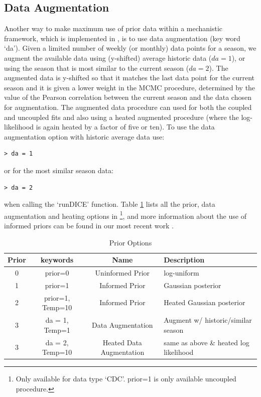 \documentclass[a4paper]{article}
\begin{document}
\subsection{Data Augmentation}
\label{sec:DA}
Another way to make maximum use of prior data within a mechanistic framework, which is implemented in , is to use data augmentation (key word `da'). Given a limited number of weekly (or monthly) data points for a season, we augment the available data using (y-shifted) average historic data ($da = 1$), or using the season that is most similar to the current season ($da = 2$).
The augmented data is y-shifted so that it matches the last data point for the current season and it is given a lower weight in the MCMC procedure, determined by the value of the Pearson correlation between the current season and the data chosen for augmentation. The augmented data procedure can used for  both the coupled and uncoupled fits and also using a heated augmented procedure (where the log-likelihood is again heated by a factor of five or ten).  To use the data augmentation option with historic average data use:
\begin{verbatim}
> da = 1
\end{verbatim}

or for the most similar season data:
\begin{verbatim}
> da = 2
\end{verbatim}

when calling the `runDICE' function.  Table \ref{tab:priors} lists all the prior, data augmentation and heating options in  \footnote{Only available for data type `CDC'.  prior=1 is only available uncoupled procedure.}, and more information about the use of informed priors can be found in our most recent work \cite{bennun18a}.


\begin{table}[h]
  \caption{Prior Options}
  \centering
  \begin{tabular}{| c | c | c |  l |}
    \hline
    Prior & keywords & Name & Description  \\ \hline
    0 & prior=0 & Uninformed Prior & log-uniform  \\ \hline
    1 & prior=1 & Informed Prior  & Gaussian posterior \\  \hline
    2 & prior=1, Temp=10 & Informed Prior  & Heated Gaussian posterior \\  \hline
    3 & da = 1, Temp=1 & Data Augmentation & Augment w/ historic/similar season \\  \hline
    3 & da = 2, Temp=10 &Heated Data Augmentation  & same as above \& heated log likelihood  \\ \hline
  \end{tabular}
  \label{tab:priors}
\end{table}
\end{document}
